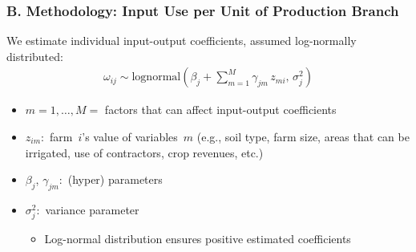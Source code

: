 \documentclass[t,24pt,aspectratio=169]{beamer}
\begin{document}
\begin{frame}[hvid]
\frametitle{\vspace{-3ex}B. Methodology: Input Use per Unit of Production Branch}
We estimate individual input-output coefficients, assumed log-normally distributed:
\begin{align*}
        \omega_{ij} \sim \text{lognormal}\left(\beta_j+\sum_{m=1}^{M} \gamma_{jm} \, z_{mi}, \, \sigma_j^2 \right)
\end{align*}
\begin{itemize}
    \item $m = 1, \ldots, M =$ factors that can affect input-output coefficients
    \item $z_{im}:$ farm~$i$'s value of variables~$m$ (e.g., soil type, farm size, areas that can be irrigated, use of contractors, crop revenues, etc.)
    \item $\beta_j$, $\gamma_{jm}:$ (hyper) parameters
    \item $\sigma_j^2:$ variance parameter
    \vspace{2ex}
    
    \begin{itemize}
        \item[\fontsize{12pt}{14pt}\selectfont $\rightarrow$]  Log-normal distribution ensures positive estimated coefficients
    \end{itemize}
\end{itemize}

\end{frame}
\end{document}
